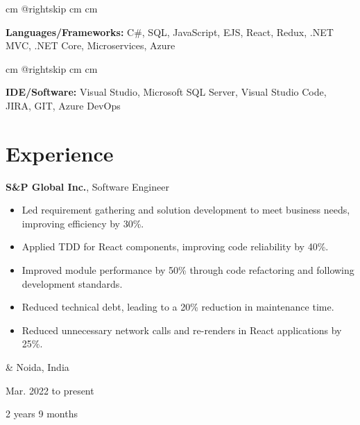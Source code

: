 \documentclass[10pt, letterpaper]{article}
\newenvironment{highlights}{
        \begin{itemize}[
                topsep=0pt,
                parsep=0.10 cm,
                partopsep=0pt,
                itemsep=0pt,
                after=\vspace{-1\baselineskip},
                leftmargin=0.4 cm + 3pt
            ]
    }{
        \end{itemize}
    } %
\let\originalTabularx\tabularx
\let\originalEndTabularx\endtabularx
\renewenvironment{tabularx}{\bgroup\centering\originalTabularx}{\originalEndTabularx\par\egroup}
\begin{document}
        \begingroup{} cm
        \advance\csname @rightskip cm
        \advance{} cm

        \textbf{Languages/Frameworks:} C\#, SQL, JavaScript, EJS, React, Redux, .NET MVC, .NET Core, Microservices, Azure \par\endgroup

        \vspace{0.2 cm}
        \begingroup{} cm
        \advance\csname @rightskip cm
        \advance{} cm

        \textbf{IDE/Software:} Visual Studio, Microsoft SQL Server, Visual Studio Code, JIRA, GIT, Azure DevOps \par\endgroup


    
    \section{Experience}

        \begin{tabularx}{
            \textwidth-0.4 cm-0.13cm
        }{
            K{0.2 cm}
            R{4.1 cm}
        }
            \textbf{S\&P Global Inc.}, Software Engineer

            \vspace{0.10 cm}

            \begin{highlights}
                \item Led requirement gathering and solution development to meet business needs, improving efficiency by 30\%.
                \item Applied TDD for React components, improving code reliability by 40\%.
                \item Improved module performance by 50\% through code refactoring and following development standards.
                \item Reduced technical debt, leading to a 20\% reduction in maintenance time.
                \item Reduced unnecessary network calls and re-renders in React applications by 25\%.
            \end{highlights}
            &
            Noida, India

            Mar. 2022 to present

            2 years 9 months
        \end{tabularx}
\end{document}
